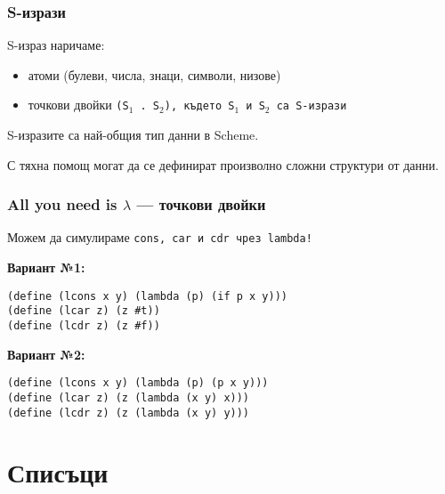 \documentclass{beamer}
\begin{document}
\begin{frame}
  \frametitle{S-изрази}

  \begin{definition}
    S-израз наричаме:
    \begin{itemize}
    \item атоми (булеви, числа, знаци, символи, низове)
    \item точкови двойки \tt{(S$_1$ . S$_2$)}, където \tt{S$_1$} и \tt{S$_2$} са S-изрази
    \end{itemize}
  \end{definition}
  \vspace{1em}

  \pause

  \alert{S-изразите са най-общия тип данни в Scheme.}

  \vspace{1em}
  С тяхна помощ могат да се дефинират произволно сложни структури от данни.
\end{frame}

\begin{frame}[fragile]
  \frametitle{All you need is $\lambda$ --- точкови двойки}

  Можем да симулираме \tt{cons}, \tt{car} и \tt{cdr} чрез \tt{lambda}!
  \vspace{1em}

  \pause

  \textbf{Вариант №1:}

\begin{verbatim}
(define (lcons x y) (lambda (p) (if p x y)))
(define (lcar z) (z #t))
(define (lcdr z) (z #f))
\end{verbatim}

  \pause

  \textbf{Вариант №2:}

\begin{verbatim}
(define (lcons x y) (lambda (p) (p x y)))
(define (lcar z) (z (lambda (x y) x)))
(define (lcdr z) (z (lambda (x y) y)))
\end{verbatim}
\end{frame}

\section{Списъци}
\end{document}
